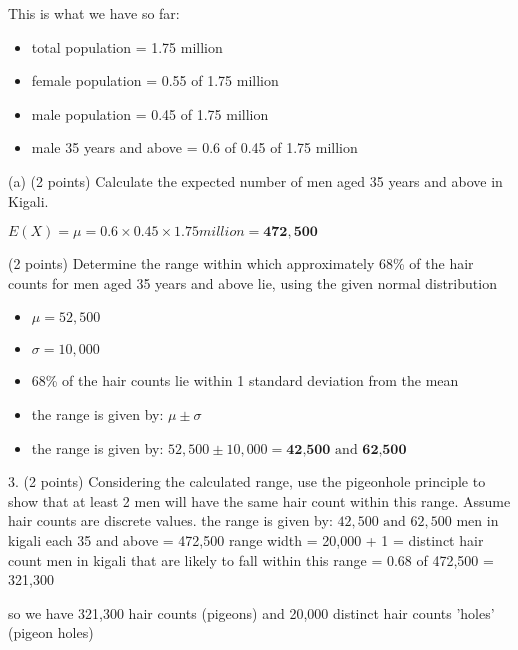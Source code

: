 \documentclass{article}
\begin{document}
This is what we have so far:

\begin{itemize}
    \item total population = 1.75 million
    \item female population = 0.55 of 1.75 million
    \item male population = 0.45 of 1.75 million
    \item male 35 years and above = 0.6 of 0.45 of 1.75 million
\end{itemize}


(a) (2 points) Calculate the expected number of men aged 35 years and above in Kigali.

\(E(X) = \mu = 0.6 \times 0.45 \times 1.75 million = \mathbf{472,500}\) \newline

(2 points) Determine the range within which approximately 68\% of the hair counts for men aged 35 years and above lie, using the given normal distribution

\begin{itemize}
    \item \(\mu = 52,500\)
    \item \(\sigma = 10,000\)
    \item 68\% of the hair counts lie within 1 standard deviation from the mean
    \item the range is given by: \(\mu \pm \sigma\)
    \item the range is given by: \(52,500 \pm 10,000 = \textbf{42,500} \text{ and } \textbf{62,500}\)
\end{itemize}

3. (2 points) Considering the calculated range, use the pigeonhole principle to show that at
least 2 men will have the same hair count within this range. Assume hair counts are discrete
values.\newline\newline
the range is given by: \(42,500 \text{ and } 62,500\)\newline
men in kigali each 35 and above = 472,500\newline
range width =  20,000 + 1 = distinct hair count\newline
men in kigali that are likely to fall within this range = 0.68 of 472,500 = 321,300\newline

so we have 321,300 hair counts (pigeons) and 20,000 distinct hair counts 'holes' (pigeon holes)\newline
\end{document}

